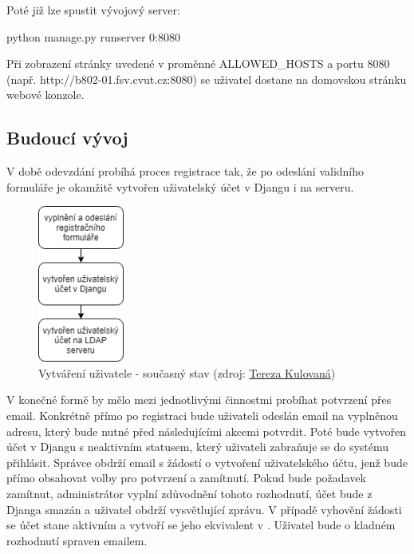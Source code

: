 Poté již lze spustit vývojový server:

\begin{center}
\textsf{python manage.py runserver 0:8080}
\end{center}

Při zobrazení stránky uvedené v proměnné \textsf{ALLOWED\_HOSTS} a
portu 8080 (např. http://b802-01.fsv.cvut.cz:8080) se uživatel dostane
na domovskou stránku webové konzole.

\subsection{Budoucí vývoj}
\label{python-knihovna}

V době odevzdání probíhá proces registrace tak, že po odeslání
validního formuláře je okamžitě vytvořen uživatelský účet v Djangu i
na  serveru.

\begin{figure}[H] \centering
    \includegraphics[width=80pt]{./pictures/my_console_current_version_cz.png}
    \caption[Vytváření uživatele - současný stav]{Vytváření uživatele - současný stav (zdroj:
	\href{}{Tereza Kulovaná})}
    \label{fig:admin-current}
\end{figure}
  
V konečné formě by mělo mezi jednotlivými činnostmi probíhat potvrzení
přes email. Konkrétně přímo po registraci bude uživateli odeslán email
na vyplněnou adresu, který bude nutné před následujícími akcemi
potvrdit. Poté bude vytvořen účet v Djangu s neaktivním statusem,
který uživateli zabraňuje se do systému přihlásit. Správce obdrží
email s žádostí o vytvoření uživatelského účtu, jenž bude přímo
obsahovat volby pro potvrzení a zamítnutí. Pokud bude požadavek
zamítnut, administrátor vyplní zdůvodnění tohoto rozhodnutí, účet bude
z Djanga smazán a uživatel obdrží vysvětlující zprávu. V případě
vyhovění žádosti se účet stane aktivním a vytvoří se jeho ekvivalent v
. Uživatel bude o kladném rozhodnutí spraven emailem.
  
